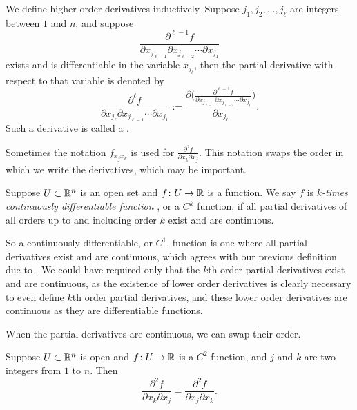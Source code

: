 We define higher order derivatives inductively.
Suppose $j_1,j_2,\ldots,j_\ell$ are integers between $1$ and $n$, and
suppose 
\begin{equation*}
\frac{\partial^{\ell-1} f}{\partial x_{j_{\ell-1}} \partial x_{j_{\ell-2}} \cdots \partial x_{j_1}}
\end{equation*}
exists and is differentiable in the variable $x_{j_{\ell}}$, then the
partial derivative with respect to that variable is denoted by
\begin{equation*}
\frac{\partial^{\ell} f}{\partial x_{j_{\ell}} \partial x_{j_{\ell-1}}
\cdots \partial x_{j_1}}
:= 
\frac{\partial \bigl( \frac{\partial^{\ell-1} f}{\partial x_{j_{\ell-1}} \partial
x_{j_{\ell-2}} \cdots \partial x_{j_1}} \bigr)}{\partial x_{j_{\ell}}} .
\end{equation*}
Such a derivative is called a
\emph{}.

Sometimes the notation $f_{x_j x_k}$ is used for
$\frac{\partial^2 f}{\partial x_k \partial x_j}$.  This notation
swaps the order in which we write the derivatives, which may be important.

\begin{defn}
Suppose $U \subset {\mathbb{R}}^n$ is an open set and
$f \colon U \to {\mathbb{R}}$ is a function.  We say $f$ is
\emph{$k$-times continuously differentiable function}%
,
or a $C^k$ function, if all partial derivatives of all orders up to and
including order $k$ exist and are continuous.
\end{defn}

So a continuously differentiable, or $C^1$, function is one where all partial
derivatives exist and are continuous, which agrees with our previous
definition due to .  We
could have required only that the $k$th order partial derivatives exist and
are continuous, as the existence of lower order derivatives is clearly
necessary to even define $k$th order partial derivatives,
and these lower order derivatives are continuous as they are differentiable
functions.

When the partial derivatives are continuous, we can swap their order.

\begin{prop} \label{mv:prop:swapders}
Suppose $U \subset {\mathbb{R}}^n$ is open and $f \colon U \to {\mathbb{R}}$ is a $C^2$
function, and $j$ and $k$ are two integers from $1$ to $n$.  Then
\begin{equation*}
\frac{\partial^2 f}{\partial x_k \partial x_j}
=
\frac{\partial^2 f}{\partial x_j \partial x_k} .
\end{equation*}
\end{prop}

